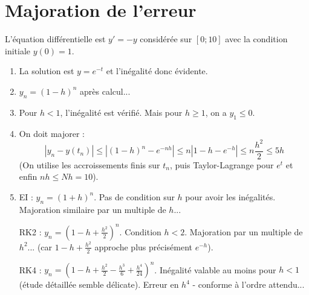 \documentclass[a4paper]{article}
\begin{document}
\section{Majoration de l'erreur}
L'équation différentielle est $y' = -y$ considérée sur $[0; 10]$ avec la condition initiale $y(0) = 1$.
\begin{enumerate}
\item   La solution est $y = e^{-t}$ et l'inégalité donc évidente.
\item   $y_n = (1 - h)^n$ après calcul...
\item  Pour $h < 1$, l'inégalité est vérifié. Mais pour $h\geq 1$, on a $y_1\leq 0$.
\item On doit majorer :
\[|y_n-y(t_n)|\leq |(1 - h)^n- e^{-nh}| \leq n|1-h-e^{-h}|\leq n\frac{h^2}{2}\leq 5h\]
(On utilise les accroissements finis sur $t_n$, puis Taylor-Lagrange pour $e^t$ et enfin $nh\leq Nh = 10$).
\item  EI : $y_n = (1+h)^n$. Pas de condition sur $h$ pour avoir les inégalités. Majoration similaire
par un multiple de $h$...

RK2 : $y_n = (1 - h+\frac{h^2}2)^n$. Condition $h < 2$. Majoration par un multiple de $h^2$... (car $1-h + \frac{h^2}2$ approche plus précisément $e^{-h}$).

RK4 : $y_n = (1 - h+\frac{h^2}2-\frac{h^3}6+\frac{h^4}{24})^n$. Inégalité valable au moins pour $h < 1$ (étude détaillée semble délicate). Erreur en $h^4$ - conforme à l'ordre attendu...
\end{enumerate}
\end{document}
